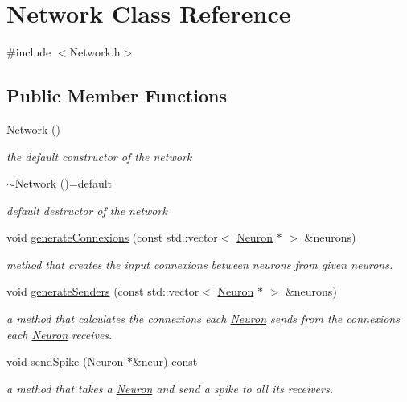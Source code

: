 \hypertarget{classNetwork}{}\section{Network Class Reference}
\label{classNetwork}


{\ttfamily \#include $<$Network.\+h$>$}

\subsection*{Public Member Functions}
\begin{DoxyCompactItemize}
\item 
\hyperlink{classNetwork_a3cc2fb4f8fa4d507077e8da85ce5a1c8}{Network} ()
\begin{DoxyCompactList}\small\item\em the default constructor of the network \end{DoxyCompactList}\item 
\hyperlink{classNetwork_ac5138f30f4a492ea6967d18a3ebd1b0f}{$\sim$\+Network} ()=default\hypertarget{classNetwork_ac5138f30f4a492ea6967d18a3ebd1b0f}{}\label{classNetwork_ac5138f30f4a492ea6967d18a3ebd1b0f}

\begin{DoxyCompactList}\small\item\em default destructor of the network \end{DoxyCompactList}\item 
void \hyperlink{classNetwork_ad8b5ad511556baadcbc557f3e7beff69}{generate\+Connexions} (const std\+::vector$<$ \hyperlink{classNeuron}{Neuron} $\ast$ $>$ \&neurons)
\begin{DoxyCompactList}\small\item\em method that creates the input connexions between neurons from given neurons. \end{DoxyCompactList}\item 
void \hyperlink{classNetwork_a99a198d49d4b4c6ea2c247264ff774ea}{generate\+Senders} (const std\+::vector$<$ \hyperlink{classNeuron}{Neuron} $\ast$ $>$ \&neurons)
\begin{DoxyCompactList}\small\item\em a method that calculates the connexions each \hyperlink{classNeuron}{Neuron} sends from the connexions each \hyperlink{classNeuron}{Neuron} receives. \end{DoxyCompactList}\item 
void \hyperlink{classNetwork_a8c444d79895bee27bff94aa47bb45733}{send\+Spike} (\hyperlink{classNeuron}{Neuron} $\ast$\&neur) const 
\begin{DoxyCompactList}\small\item\em a method that takes a \hyperlink{classNeuron}{Neuron} and send a spike to all its receivers. \end{DoxyCompactList}\end{DoxyCompactItemize}


